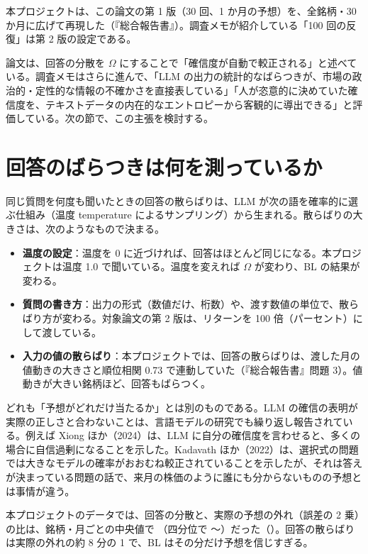 本プロジェクトは、この論文の第 1 版（30 回、1 か月の予想）を、全銘柄・30 か月に広げて再現した（『総合報告書』）。調査メモが紹介している「100 回の反復」は第 2 版の設定である。

論文は、回答の分散を $\Omega$ にすることで「確信度が自動で較正される」と述べている。調査メモはさらに進んで、「LLM の出力の統計的なばらつきが、市場の政治的・定性的な情報の不確かさを直接表している」「人が恣意的に決めていた確信度を、テキストデータの内在的なエントロピーから客観的に導出できる」と評価している。次の節で、この主張を検討する。

\section{回答のばらつきは何を測っているか}

同じ質問を何度も聞いたときの回答の散らばりは、LLM が次の語を確率的に選ぶ仕組み（温度 temperature によるサンプリング）から生まれる。散らばりの大きさは、次のようなもので決まる。

\begin{itemize}
\item \textbf{温度の設定}：温度を 0 に近づければ、回答はほとんど同じになる。本プロジェクトは温度 1.0 で聞いている。温度を変えれば $\Omega$ が変わり、BL の結果が変わる。
\item \textbf{質問の書き方}：出力の形式（数値だけ、桁数）や、渡す数値の単位で、散らばり方が変わる。対象論文の第 2 版は、リターンを 100 倍（パーセント）にして渡している。
\item \textbf{入力の値の散らばり}：本プロジェクトでは、回答の散らばりは、渡した月の値動きの大きさと順位相関 0.73 で連動していた（『総合報告書』問題 3）。値動きが大きい銘柄ほど、回答もばらつく。
\end{itemize}

どれも「予想がどれだけ当たるか」とは別のものである。LLM の確信の表明が実際の正しさと合わないことは、言語モデルの研究でも繰り返し報告されている。例えば Xiong ほか（2024）は、LLM に自分の確信度を言わせると、多くの場合に自信過剰になることを示した。Kadavath ほか（2022）は、選択式の問題では大きなモデルの確率がおおむね較正されていることを示したが、それは答えが決まっている問題の話で、来月の株価のように誰にも分からないものの予想とは事情が違う。

本プロジェクトのデータでは、回答の分散と、実際の予想の外れ（誤差の 2 乗）の比は、銘柄・月ごとの中央値で （四分位で 〜）だった（）。回答の散らばりは実際の外れの約 8 分の 1 で、BL はその分だけ予想を信じすぎる。

